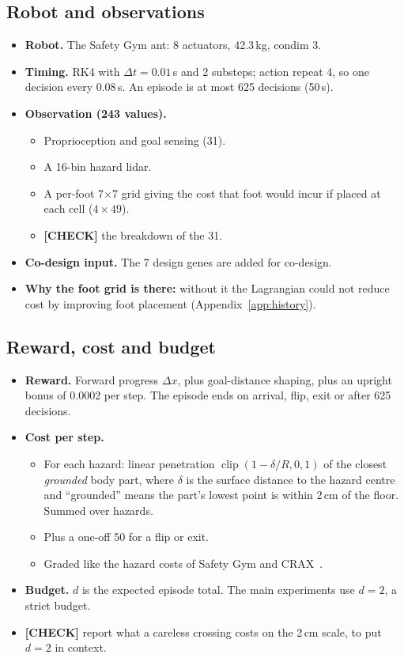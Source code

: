 \documentclass[sigconf,review]{acmart}
\newcommand{\statustag}[2]{\textcolor{#1}{\textsf{\scriptsize\bfseries[#2]}}}
\newcommand{\CHECK}{\statustag{orange!85!black}{CHECK}\hspace{0.3em}}
\begin{document}
\subsection{Robot and observations}
\begin{itemize}
\item \textbf{Robot.} The Safety Gym ant: 8 actuators, 42.3\,kg, condim 3.
\item \textbf{Timing.} RK4 with $\Delta t = 0.01$\,s and 2 substeps; action repeat 4, so one decision every 0.08\,s. An episode is at most 625 decisions (50\,s).
\item \textbf{Observation (243 values).}
  \begin{itemize}
  \item Proprioception and goal sensing (31).
  \item A 16-bin hazard lidar.
  \item A per-foot 7$\times$7 grid giving the cost that foot would incur if placed at each cell ($4 \times 49$).
  \item \CHECK{} the breakdown of the 31.
  \end{itemize}
\item \textbf{Co-design input.} The 7 design genes are added for co-design.
\item \textbf{Why the foot grid is there:} without it the Lagrangian could not reduce cost by improving foot placement (Appendix~\ref{app:history}).
\end{itemize}

\subsection{Reward, cost and budget}
\begin{itemize}
\item \textbf{Reward.} Forward progress $\Delta x$, plus goal-distance shaping, plus an upright bonus of 0.0002 per step. The episode ends on arrival, flip, exit or after 625 decisions.
\item \textbf{Cost per step.}
  \begin{itemize}
  \item For each hazard: linear penetration $\operatorname{clip}(1 - \delta/R, 0, 1)$ of the closest \emph{grounded} body part, where $\delta$ is the surface distance to the hazard centre and ``grounded'' means the part's lowest point is within 2\,cm of the floor. Summed over hazards.
  \item Plus a one-off 50 for a flip or exit.
  \item Graded like the hazard costs of Safety Gym and CRAX~\cite{ray2019benchmarking,tomilin2026crax}.
  \end{itemize}
\item \textbf{Budget.} $d$ is the expected episode total. The main experiments use $d = 2$, a strict budget.
\item \CHECK{} report what a careless crossing costs on the 2\,cm scale, to put $d = 2$ in context.
\end{itemize}
\end{document}
